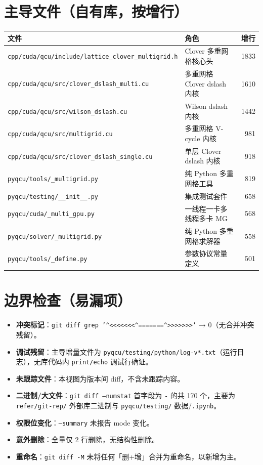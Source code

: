 \documentclass[UTF8]{ctexart}
\begin{document}
\section{主导文件（自有库，按增行）}

\begin{xltabular}{\textwidth}{lXr}
\toprule
\textcolor{struct}{文件} & 角色 & 增行 \\
\midrule
\endhead
\texttt{\nolinkurl{cpp/cuda/qcu/include/lattice_clover_multigrid.h}} & Clover 多重网格核心头 & 1833 \\
\texttt{\nolinkurl{cpp/cuda/qcu/src/clover_dslash_multi.cu}} & 多重网格 Clover dslash 内核 & 1610 \\
\texttt{\nolinkurl{cpp/cuda/qcu/src/wilson_dslash.cu}} & Wilson dslash 内核 & 1442 \\
\texttt{\nolinkurl{cpp/cuda/qcu/src/multigrid.cu}} & 多重网格 V-cycle 内核 & 981 \\
\texttt{\nolinkurl{cpp/cuda/qcu/src/clover_dslash_single.cu}} & 单层 Clover dslash 内核 & 918 \\
\texttt{\nolinkurl{pyqcu/tools/_multigrid.py}} & 纯 Python 多重网格工具 & 819 \\
\texttt{\nolinkurl{pyqcu/testing/__init__.py}} & 集成测试套件 & 658 \\
\texttt{\nolinkurl{pyqcu/cuda/_multi_gpu.py}} & 一线程一卡多线程多卡 MG & 568 \\
\texttt{\nolinkurl{pyqcu/solver/_multigrid.py}} & 纯 Python 多重网格求解器 & 558 \\
\texttt{\nolinkurl{pyqcu/tools/_define.py}} & 参数协议常量定义 & 501 \\
\bottomrule
\end{xltabular}

\section{边界检查（易漏项）}

\begin{itemize}
  \item \textbf{冲突标记}：\texttt{git diff \textbar{} grep '\^{}<<<<<<<\textbar{}\^{}=======\textbar{}\^{}>>>>>>>'} → \textcolor{evidence}{0}（无合并冲突残留）。
  \item \textbf{调试残留}：主导增量文件为 \texttt{pyqcu/testing/python/log-v*.txt}（运行日志），无库代码内 \texttt{print/echo} 调试行确证。
  \item \textbf{未跟踪文件}：本视图为版本间 diff，不含未跟踪内容。
  \item \textbf{二进制/大文件}：\texttt{git diff --numstat} 首字段为 \texttt{-} 的共 \textcolor{evidence}{170} 个，主要为 \texttt{refer/git-rep/} 外部库二进制与 \texttt{pyqcu/testing/} 数据/\texttt{.ipynb}。
  \item \textbf{权限位变化}：\texttt{--summary} 未报告 mode 变化。
  \item \textbf{意外删除}：全量仅 \textcolor{evidence}{2} 行删除，无结构性删除。
  \item \textbf{重命名}：\texttt{git diff -M} 未将任何「删+增」合并为重命名，以新增为主。
\end{itemize}
\end{document}
